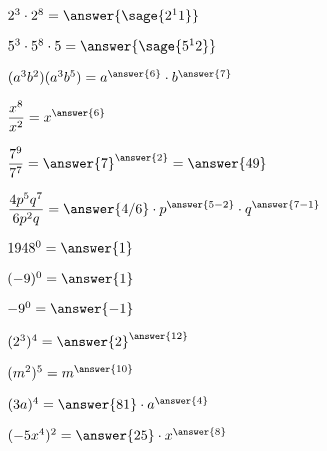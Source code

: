 \documentclass{ximera}
\begin{document}
\begin{problem}
$2^3 \cdot 2^8 =\answer{\sage{2^11}} $
\end{problem}

\begin{problem}
$5^3 \cdot 5^8 \cdot 5 = \answer{\sage{5^12}} $ 
\end{problem}

\begin{problem}
$(a^3 b^2)(a^3 b^5) = a^{\answer{6}}\cdot b^{\answer{7}}$
\end{problem}

\begin{problem}
$\displaystyle \frac{x^8}{x^2} = x^{\answer{6}} $
\end{problem}

\begin{problem}
$\displaystyle \frac{7^9}{7^7} = \answer{7}^{\answer{2}}=\answer{49} $
\end{problem}

\begin{problem}
 $\displaystyle \frac{4p^5q^7}{6p^2q} = \answer{4/6}\cdot p^{\answer{5-2}} \cdot q^{\answer{7-1}} $
\end{problem}

\begin{problem}
 $1948^0 = \answer{1}$ 
\end{problem}

\begin{problem}
 $(-9)^0 = \answer{1}$ 
\end{problem}

\begin{problem}
$-9^0 = \answer{-1}$ 
\end{problem}

\begin{problem}
$(2^3)^4 = \answer{2}^{\answer{12}}$
\end{problem}

\begin{problem}
$(m^2)^5 = m^{\answer{10}}$ 
\end{problem}

\begin{problem}
$(3a)^4 = \answer{81}\cdot a^{\answer{4}}$
\end{problem}

\begin{problem}
$(-5x^4)^2 = \answer{25}\cdot x^{\answer{8}}$ 
\end{problem}
\end{document}
